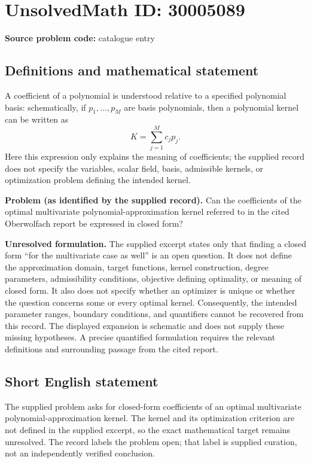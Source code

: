 \documentclass[11pt]{article}
\begin{document}
\section*{UnsolvedMath ID: 30005089}
\textbf{Source problem code:} catalogue entry
\subsection{Definitions and mathematical statement}
A coefficient of a polynomial is understood relative to a specified polynomial basis: schematically, if \(p_1,\ldots,p_M\) are basis polynomials, then a polynomial kernel can be written as
\[
K=\sum_{j=1}^{M}c_jp_j.
\]
Here this expression only explains the meaning of coefficients; the supplied record does not specify the variables, scalar field, basis, admissible kernels, or optimization problem defining the intended kernel.

\textbf{Problem (as identified by the supplied record).} Can the coefficients of the optimal multivariate polynomial-approximation kernel referred to in the cited Oberwolfach report be expressed in closed form?

\textbf{Unresolved formulation.} The supplied excerpt states only that finding a closed form ``for the multivariate case as well'' is an open question. It does not define the approximation domain, target functions, kernel construction, degree parameters, admissibility conditions, objective defining optimality, or meaning of closed form. It also does not specify whether an optimizer is unique or whether the question concerns some or every optimal kernel. Consequently, the intended parameter ranges, boundary conditions, and quantifiers cannot be recovered from this record. The displayed expansion is schematic and does not supply these missing hypotheses. A precise quantified formulation requires the relevant definitions and surrounding passage from the cited report.
\subsection{Short English statement}
The supplied problem asks for closed-form coefficients of an optimal multivariate polynomial-approximation kernel. The kernel and its optimization criterion are not defined in the supplied excerpt, so the exact mathematical target remains unresolved. The record labels the problem open; that label is supplied curation, not an independently verified conclusion.
\end{document}
